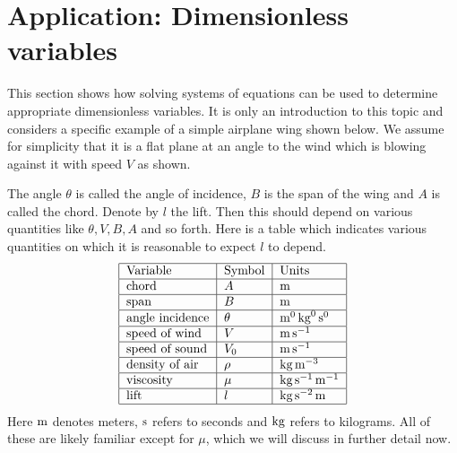 \section{Application: Dimensionless variables}

This section shows how solving systems of equations can be used to
determine appropriate dimensionless variables. It is only an
introduction to this topic and considers a specific example of a
simple airplane wing shown below. We assume for simplicity that it is a flat plane at an angle to the wind which is blowing against it
with speed $V$ as shown.

\begin{center}
\end{center}

The angle $\theta$ is called the angle of incidence, $B$ is the span of the wing and $A$ is called the chord. Denote by $l$ the lift. Then this should depend on
various quantities like $\theta ,V,B,A$ and so forth. Here is a table which
indicates various quantities on which it is reasonable to expect $l$ to
depend.
\begin{equation*}
\begin{tabular}{|l|l|l|}
\hline
Variable & Symbol & Units \\ \hline
chord & $A$ & $\m$ \\ \hline
span & $B$ & $\m$ \\ \hline
angle incidence & $\theta $ & $\m^0\kg^0\s^0$ \\ \hline
speed of wind & $V$ & $\m\s^{-1}$ \\ \hline
speed of sound & $V_{0}$ & $\m\s^{-1}$ \\ \hline
density of air & $\rho $ & $\kg\m^{-3}$ \\ \hline
viscosity & $\mu $ & $\kg\s^{-1}\m^{-1}$ \\ \hline
lift & $l$ & $\kg\s^{-2}\m$ \\ \hline
\end{tabular}
\end{equation*}
Here $\mathop{\textrm{\rm m}}\nolimits$ denotes meters, $\mathop{\textrm{\rm s}}\nolimits $ refers to seconds and $\mathop{\textrm{\rm kg}}\nolimits$ refers to
kilograms. All of these are likely familiar except for $\mu$, which we will discuss in further detail now.

